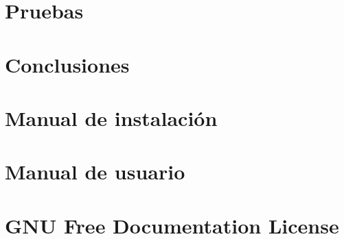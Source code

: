 \documentclass[a4paper, 12pt]{book}
\begin{document}
\chapter{Pruebas}
\label{chap:pruebas}


\chapter{Conclusiones}
\label{chap:conclusiones}


\appendix

\chapter{Manual de instalación}
\label{chap:manual_instalacion}


\chapter{Manual de usuario}
\label{chap:manual_usuario}


\chapter{GNU Free Documentation License}
\label{sec:fdl}




\end{document}
